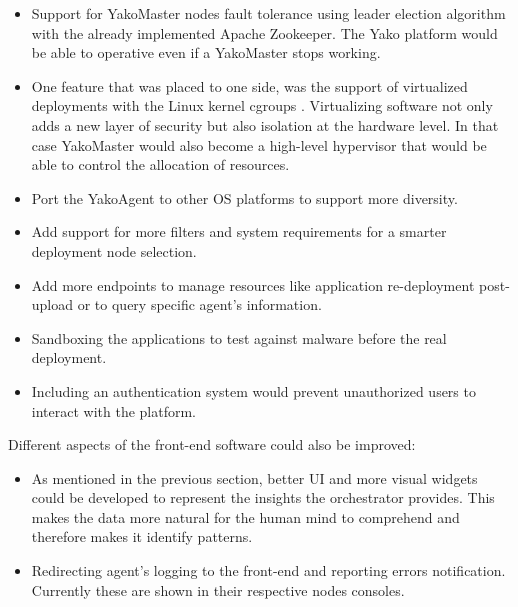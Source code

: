         \begin{itemize}
            \item Support for YakoMaster nodes fault tolerance using leader election algorithm \cite{amazon_inc_leader_nodate} with the already implemented Apache Zookeeper. The Yako platform would be able to operative even if a YakoMaster stops working.
            \item One feature that was placed to one side, was the support of virtualized deployments with the Linux kernel cgroups \cite{the_linux_foundation_control_nodate}. Virtualizing software not only adds a new layer of security but also isolation at the hardware level. In that case YakoMaster would also become a high-level hypervisor that would be able to control the allocation of resources.
            \item Port the YakoAgent to other OS platforms to support more diversity. 
            \item Add support for more filters and system requirements for a smarter deployment node selection.
            \item Add more endpoints to manage resources like application re-deployment post-upload or to query specific agent's information.
            \item Sandboxing \cite{check_point_what_nodate} the applications to test against malware before the real deployment.
            \item Including an authentication system would prevent unauthorized users to interact with the platform.
        \end{itemize}
        
        Different aspects of the front-end software could also be improved:
        \begin{itemize}
            \item As mentioned in the previous section, better UI and more visual widgets could be developed to represent the insights the orchestrator provides. This makes the data more natural for the human mind to comprehend and therefore makes it identify patterns.
            \item Redirecting agent's logging to the front-end and reporting errors notification. Currently these are shown in their respective nodes consoles.
        \end{itemize}